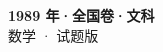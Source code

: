\documentclass[zihao=-4, a4paper]{ctexart}
\begin{document}
\begin{center}
  {\Large\bfseries 1989 年·全国卷·文科}\\[4pt]
  {\large 数学 · 试题版}
\end{center}
\medskip
{}

\end{document}
